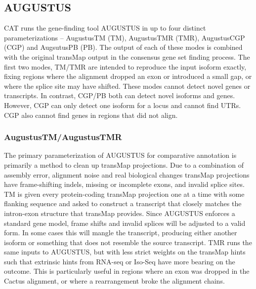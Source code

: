 \documentclass[fleqn,10pt]{wlscirep}
\begin{document}
\subsection*{AUGUSTUS}
	CAT runs the gene-finding tool AUGUSTUS in up to four distinct parameterizations -- AugustusTM (TM), AugustusTMR (TMR), AugustusCGP (CGP) and AugsutusPB (PB). The output of each of these modes is combined with the original transMap output in the consensus gene set finding process. The first two modes, TM/TMR are intended to reproduce the input isoform exactly, fixing regions where the alignment dropped an exon or introduced a small gap, or where the splice site may have shifted. These modes cannot detect novel genes or transcripts. In contrast, CGP/PB both can detect novel isoforms and genes. However, CGP can only detect one isoform for a locus and cannot find UTRs. CGP also cannot find genes in regions that did not align. 
  
\subsubsection*{AugustusTM/AugustusTMR}
	The primary parameterization of AUGUSTUS for comparative annotation is primarily a method to clean up transMap projections. Due to a combination of assembly error, alignment noise and real biological changes transMap projections have frame-shifting indels, missing or incomplete exons, and invalid splice sites. TM is given every protein-coding transMap projection one at a time with some flanking sequence and asked to construct a transcript that closely matches the intron-exon structure that transMap provides. Since AUGUSTUS enforces a standard gene model, frame shifts and invalid splices will be adjusted to a valid form. In some cases this will mangle the transcript, producing either another isoform or something that does not resemble the source transcript. TMR runs the same inputs to AUGUSTUS, but with less strict weights on the transMap hints such that extrinsic hints from RNA-seq or Iso-Seq have more bearing on the outcome. This is particularly useful in regions where an exon was dropped in the Cactus alignment, or where a rearrangement broke the alignment chains.
  
\end{document}
